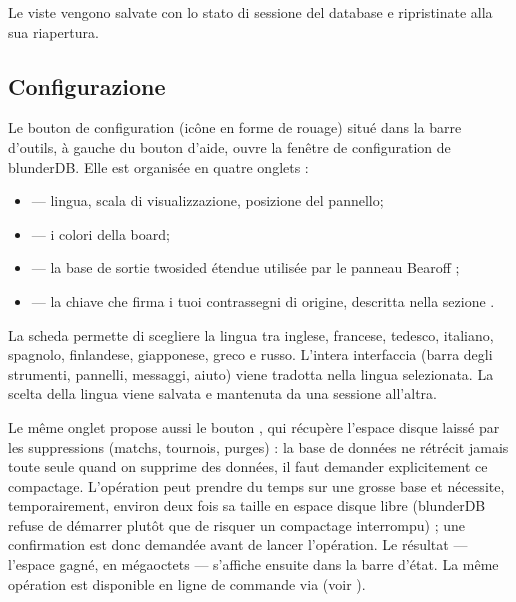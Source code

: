 \documentclass[letterpaper,10pt,italian]{sphinxmanual}
\begin{document}
\sphinxAtStartPar
Le viste vengono salvate con lo stato di sessione del database e ripristinate alla sua riapertura.


\subsection{Configurazione}
\label{\detokenize{manuel:configuration}}\label{\detokenize{manuel:id2}}
\sphinxAtStartPar
Le bouton de configuration (icône en forme de rouage) situé dans la barre
d’outils, à gauche du bouton d’aide, ouvre la fenêtre de configuration de
blunderDB. Elle est organisée en quatre onglets :
\begin{itemize}
\item {} 
\sphinxAtStartPar
{} — lingua, scala di visualizzazione, posizione del pannello;

\item {} 
\sphinxAtStartPar
{} — i colori della board;

\item {} 
\sphinxAtStartPar
{} — la base de sortie two\sphinxhyphen{}sided étendue utilisée par le panneau
Bearoff ;

\item {} 
\sphinxAtStartPar
{} — la chiave che firma i tuoi contrassegni di origine, descritta nella sezione {\hyperref[\detokenize{manuel:diffusion-controlee}]{}}.

\end{itemize}

\sphinxAtStartPar
La scheda  permette di scegliere la lingua tra inglese, francese, tedesco, italiano, spagnolo, finlandese, giapponese, greco e russo. L’intera interfaccia (barra degli strumenti, pannelli, messaggi, aiuto) viene tradotta nella lingua selezionata. La scelta della lingua viene salvata e mantenuta da una sessione all’altra.

\sphinxAtStartPar
Le même onglet propose aussi le bouton , qui récupère
l’espace disque laissé par les suppressions (matchs, tournois, purges) : la
base de données ne rétrécit jamais toute seule quand on supprime des données,
il faut demander explicitement ce compactage. L’opération peut prendre du
temps sur une grosse base et nécessite, temporairement, environ deux fois sa
taille en espace disque libre (blunderDB refuse de démarrer plutôt que de
risquer un compactage interrompu) ; une confirmation est donc demandée avant
de lancer l’opération. Le résultat — l’espace gagné, en mégaoctets — s’affiche
ensuite dans la barre d’état. La même opération est disponible en ligne de
commande via  (voir {\hyperref[\detokenize{cli:cli}]{}}).
\end{document}
